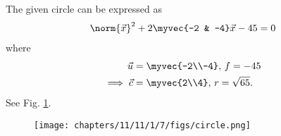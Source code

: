 The given circle can be expressed as
\begin{align}
    \label{eq:chapters/11/11/1/7/given} 
    \norm{\vec{x}}^2  + 2\myvec{-2 & -4}\vec{x} - 45 = 0
\end{align}
where
\begin{align}	
	\vec{u} &= \myvec{-2\\-4},\, f = -45 \\
	\implies \vec{c} &= \myvec{2\\4},\,
	r = \sqrt{65}.	
\end{align}
See Fig. 
    \ref{fig:chapters/11/11/1/7/cicle}.
\begin{figure}[H]
    \centering
    \texttt{[image: chapters/11/11/1/7/figs/circle.png]}
    \caption{}
    \label{fig:chapters/11/11/1/7/cicle}
\end{figure}

